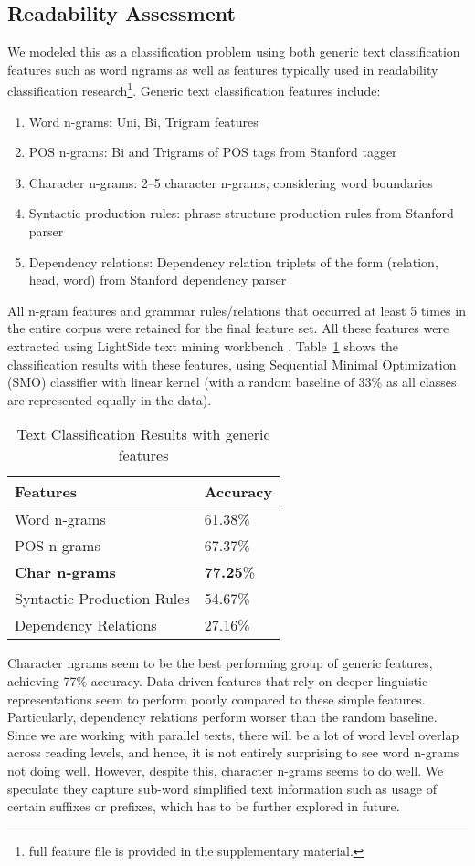 \documentclass[11pt,a4paper]{article}
\begin{document}
\subsection{Readability Assessment}
We modeled this as a classification problem  using both generic text classification features such as word ngrams as well as features typically used in readability classification research\footnote{full feature file is provided in the supplementary material.}.  Generic text classification features include:
\begin{enumerate}
\item Word n-grams: Uni, Bi, Trigram features
\item POS n-grams: Bi and Trigrams of POS tags from Stanford tagger \cite{Toutanova.Klein.ea-03}
\item Character n-grams: 2--5 character n-grams, considering word boundaries
\item Syntactic production rules: phrase structure production rules from Stanford parser \cite{Klein.Manning-03}
\item Dependency relations: Dependency relation triplets of the form (relation, head, word) from Stanford dependency parser \cite{Chen.Manning-14}
\end{enumerate}
All n-gram features and grammar rules/relations that occurred at least 5 times in the entire corpus were retained for the final feature set. All these features were extracted using LightSide text mining workbench \cite{Mayfield.Rose-13}. Table~\ref{tab:araresults} shows the classification results with these features, using Sequential Minimal Optimization (SMO) classifier with linear kernel (with a random baseline of 33\% as all classes are represented equally in the data).

\begin{table}[h!]
\begin{tabular}{|l|l|}
\hline Features & Accuracy \\
\hline Word n-grams & 61.38\% \\ %
\hline POS n-grams & 67.37\% \\ %
\hline \textbf{Char n-grams} & \textbf{77.25}\%\\ %
\hline Syntactic Production Rules & 54.67\% \\
\hline Dependency Relations & 27.16\% \\
\hline
\end{tabular}
\caption{Text Classification Results with generic features}
\label{tab:araresults}
\end{table}
Character ngrams seem to be the best performing group of generic features, achieving 77\% accuracy. Data-driven features that rely on deeper linguistic representations seem to perform poorly compared to these simple features. Particularly, dependency relations perform worser than the random baseline. Since we are working with parallel texts, there will be a lot of word level overlap across reading levels, and hence, it is not entirely surprising to see word n-grams not doing well. However, despite this, character n-grams seems to do well. We speculate they capture sub-word simplified text information such as usage of certain suffixes or prefixes, which has to be further explored in future. 
\end{document}
